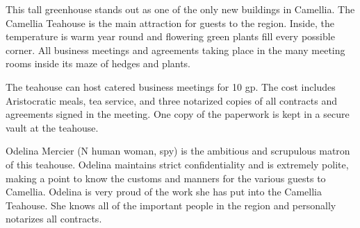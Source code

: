 This tall greenhouse stands out as one of the only new buildings in Camellia.
The Camellia Teahouse is the main attraction for guests to the region.
Inside, the temperature is warm year round and flowering green plants fill every possible corner.
All business meetings and agreements taking place in the many meeting rooms inside its maze of hedges and plants.

The teahouse can host catered business meetings for 10 gp.
The cost includes Aristocratic meals, tea service, and three notarized copies of all contracts and agreements signed in the meeting.
One copy of the paperwork is kept in a secure vault at the teahouse.

Odelina Mercier (N human woman, spy) is the ambitious and scrupulous matron of this teahouse.
Odelina maintains strict confidentiality and is extremely polite, making a point to know the customs and manners for the various guests to Camellia.
Odelina is very proud of the work she has put into the Camellia Teahouse.
She knows all of the important people in the region and personally notarizes all contracts.
